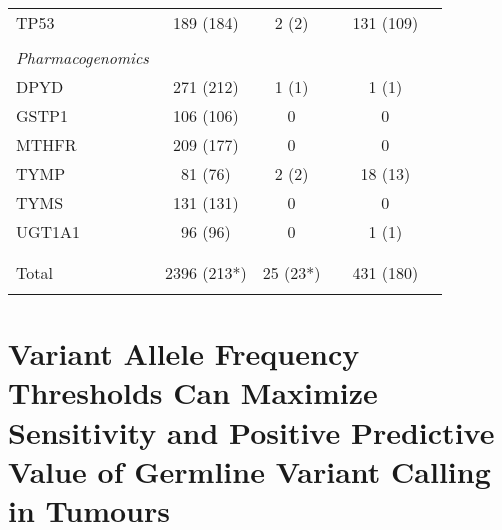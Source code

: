 \begin{table}[htb]
\begin{tabular}{lcclcl}
				\hline
				TP53 & 189 (184) & 2 (2) && 131 (109) \\
				\arrayrulecolor{black}\hline
				\\
				\multicolumn{1}{l}{\textit{Pharmacogenomics}}
				&
				\multicolumn{2}{l}{ }
				&&
				\multicolumn{1}{l}{} \\
				\arrayrulecolor{black}\hline
				DPYD & 271 (212) & 1 (1) && 1 (1) \\
				\arrayrulecolor{evagrey}\hline
				GSTP1 & 106 (106) & 0 && 0 \\
				\hline
				MTHFR & 209 (177) & 0 && 0 \\
				\hline
				TYMP & 81 (76) & 2 (2) && 18 (13)\\
				\hline
				TYMS & 131 (131) & 0 && 0 \\
				\hline
				UGT1A1 & 96 (96) & 0 && 1 (1) \\
				\arrayrulecolor{black}\hline \\
				\\
				Total & 2396 (213*) & 25 (23*) && 431 (180) \\
				\arrayrulecolor{black}\hline
      \end{tabular}
\end{table}

\section{Variant Allele Frequency Thresholds Can Maximize Sensitivity and Positive Predictive Value of Germline Variant Calling in Tumours}
\label{sec:VariantAlleleFrequencyThresholdsCanMaximizeSensitivityandPositivePredictiveValueofGermlineVariantCallinginTumours}
